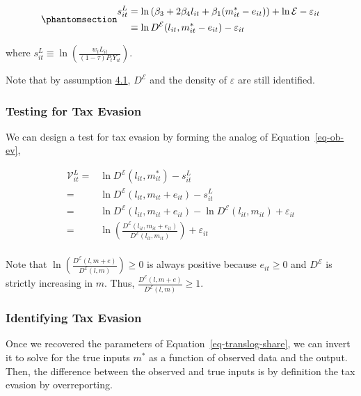 \documentclass[
  12pt]{article}
\theoremstyle{definition}
\theoremstyle{remark}
\begin{document}
\begin{equation}\phantomsection\label{eq-translog-share}{
\begin{aligned}
    s_{it}^{L}&=\ln \left(\beta_3+2\beta_4l_{it}+\beta_1(m^*_{it}-e_{it})\right) + \ln \mathcal{E}- \varepsilon_{it} \\
    &\equiv \ln D^{\mathcal{E}}(l_{it},m^*_{it}-e_{it})- \varepsilon_{it} 
\end{aligned}
}\end{equation}

where
\(s_{it}^{L} \equiv\ln\left(\frac{w_t L_{it}}{(1-\tau)P_{t}Y_{it}}\right)\).

Note that by assumption \hyperref[ass-non-ev]{4.1}, \(D^{\mathcal{E}}\)
and the density of \(\varepsilon\) are still identified.

\subsubsection{Testing for Tax Evasion}\label{testing-for-tax-evasion}

We can design a test for tax evasion by forming the analog of
Equation~\ref{eq-ob-ev},

\[
\begin{aligned}
\mathcal{V}_{it}^{L} =&\ln D^{\mathcal{E}}(l_{it},m_{it}^*)-s_{it}^L\\
    =&\ln D^{\mathcal{E}}(l_{it},m_{it}+e_{it})-s_{it}^L\\
    =&\ln D^{\mathcal{E}}(l_{it},m_{it}+e_{it})-\ln D^{\mathcal{E}}(l_{it},m_{it})+\varepsilon_{it}\\
    =&\ln\left(\frac{D^{\mathcal{E}}(l_{it},m_{it}+e_{it})}{D^{\mathcal{E}}(l_{it},m_{it})}\right)+\varepsilon_{it}\\
\end{aligned}
\]

Note that
\(\ln\left(\frac{D^{\mathcal{E}}(l,m+e)}{D^{\mathcal{E}}(l,m)}\right)\ge0\)
is always positive because \(e_{it}\ge0\) and \(D^{\mathcal{E}}\) is
strictly increasing in \(m\). Thus,
\(\frac{D^{\mathcal{E}}(l,m+e)}{D^{\mathcal{E}}(l,m)}\ge1\).

\subsubsection{Identifying Tax Evasion}\label{identifying-tax-evasion-1}

Once we recovered the parameters of Equation~\ref{eq-translog-share}, we
can invert it to solve for the true inputs \(m^*\) as a function of
observed data and the output. Then, the difference between the observed
and true inputs is by definition the tax evasion by overreporting.
\end{document}
